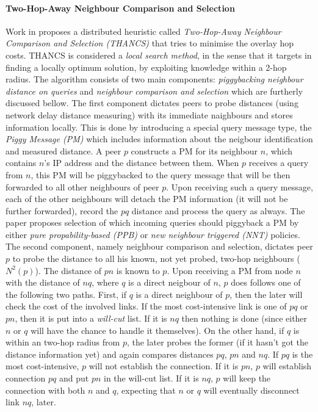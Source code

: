 \paragraph*{\bf Two-Hop-Away Neighbour Comparison and Selection}
Work in \cite{liu_thancs_2005,liu_thancs_2008} proposes a distributed heuristic
called \emph{Two-Hop-Away Neighbour Comparison and Selection (THANCS)} that
tries to minimise the overlay hop costs. THANCS is considered a \emph{local
search method}, in the sense that it targets in finding a locally optimum
solution, by exploiting knowledge within a 2-hop radius. The algorithm consists
of two main components: \emph{piggybacking neighbour distance on queries} and
\emph{neighbour comparison and selection} which are furtherly discussed bellow.
The first component dictates peers to probe distances (using network delay
distance measuring) with its immediate naighbours and stores information
locally. This is done by introducing a special query message type, the
\emph{Piggy Message (PM)} which includes information about the neigbour
identification and measured distance. A peer $p$ constructs a PM for its
neighbour $n$, which contains $n$'s IP address and the distance between them.
When $p$ receives a query from $n$, this PM will be piggybacked to the query
message that will be then forwarded to all other neighbours of peer $p$. Upon
receiving such a query message, each of the other neighbours will detach the PM
information (it will not be further forwarded), record the $pq$ distance and
process the query as always. The paper proposes selection of which incoming
queries should piggyback a PM by either \emph{pure propability-based (PPB)} or
\emph{new neighbour triggered (NNT)} policies. The second component, namely
neighbour comparison and selection, dictates peer $p$ to probe the distance to
all his known, not yet probed, two-hop neighbours ($ N^2(p)$). The distance of
$pn$ is known to $p$. Upon receiving a PM from node $n$ with the distance of
$nq$, where $q$ is a direct neigbour of $n$, $p$ does follows one of the
following two paths. First, if $q$ is a direct neighbour of $p$, then the later
will check the cost of the involved links. If the most cost-intensive link is
one of $pq$ or $pn$, then it is put into a \emph{will-cut} list. If it is $nq$
then nothing is done (since either $n$ or $q$ will have the chance to handle it
themselves). On the other hand, if $q$ is within an two-hop radius from $p$,
the later probes the former (if it hasn't got the distance information yet) and
again compares distances $pq$, $pn$ and $nq$. If $pq$ is the most
cost-intensive, $p$ will not establish the connection. If it is $pn$, $p$ will
establish connection $pq$ and put $pn$ in the will-cut list. If it is $nq$, $p$
will keep the connection with both $n$ and $q$, expecting that $n$ or $q$ will
eventually disconnect link $nq$, later.

